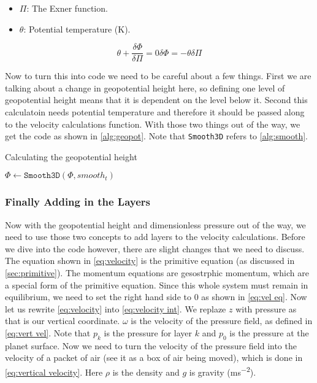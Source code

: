 \begin{itemize}
    \item $\Pi$: The Exner function.
    \item $\theta$: Potential temperature (\si{K}).
\end{itemize}

\begin{subequations}
    \begin{equation}
        \label{eq:geopot}
        \theta + \frac{\delta\Phi}{\delta\Pi} = 0
    \end{equation}
    \begin{equation}
        \label{eq:geopot final}
        \delta\Phi = -\theta\delta\Pi
    \end{equation}
\end{subequations}

Now to turn this into code we need to be careful about a few things. First we are talking about a change in geopotential height here, so defining one level of geopotential height means that it 
is dependent on the level below it. Second this calculatoin needs potential temperature and therefore it should be passed along to the velocity calculations function. With those two things out 
of the way, we get the code as shown in \autoref{alg:geopot}. Note that \texttt{Smooth3D} refers to \autoref{alg:smooth}.

\begin{algorithm}
    \caption{Calculating the geopotential height}
    \label{alg:geopot}
    $\Phi \leftarrow \texttt{Smooth3D}(\Phi, smooth_t)$ \;
\end{algorithm}

\subsubsection{Finally Adding in the Layers}
Now with the geopotential height and dimensionless pressure out of the way, we need to use those two concepts to add layers to the velocity calculations. Before we dive into the code however, 
there are slight changes that we need to discuss. The equation shown in \autoref{eq:velocity} is the primitive equation (as discussed in \autoref{sec:primitive}). The momentum equations are 
gesostrphic momentum, which are a special form of the primitive equation. Since this whole system must remain in equilibrium, we need to set the right hand side to $0$ as shown in 
\autoref{eq:vel eq}. Now let us rewrite \autoref{eq:velocity} into \autoref{eq:velocity int}. We replaze $z$ with pressure as that is our vertical coordinate. $\omega$ is the velocity of the 
pressure field, as defined in \autoref{eq:vert vel}. Note that $p_k$ is the pressure for layer $k$ and $p_0$ is the pressure at the planet surface. Now we need to turn the velocity of the 
pressure field into the velocity of a packet of air (see it as a box of air being moved), which is done in \autoref{eq:vertical velocity}. Here $\rho$ is the density and $g$ is gravity 
(\si{ms^{-2}}).

